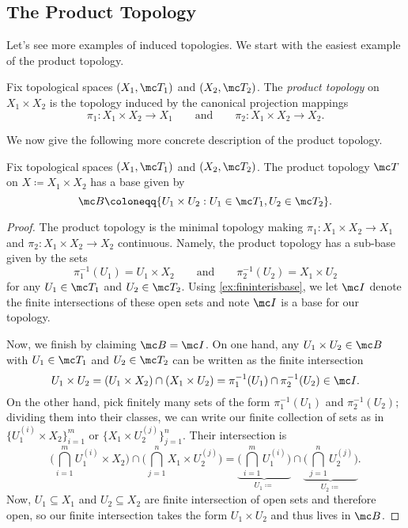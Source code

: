 \documentclass[../notes.tex]{subfiles}
\begin{document}
\subsection{The Product Topology}
Let's see more examples of induced topologies. We start with the easiest example of the product topology.
\begin{defihelper}
	Fix topological spaces $(X_1,\mc T_1)$ and $(X_2,\mc T_2)$. The \textit{product topology} on $X_1\times X_2$ is the topology induced by the canonical projection mappings
	\[\pi_1\colon X_1\times X_2\to X_1\qquad\text{and}\qquad\pi_2\colon X_1\times X_2\to X_2.\]
\end{defihelper}
We now give the following more concrete description of the product topology.
\begin{lemma} \label{lem:twoprodtop}
	Fix topological spaces $(X_1,\mc T_1)$ and $(X_2,\mc T_2)$. The product topology $\mc T$ on $X\coloneqq X_1\times X_2$ has a base given by
	\[\mc B\coloneqq\{U_1\times U_2:U_1\in\mc T_1,U_2\in\mc T_2\}.\]
\end{lemma}
\begin{proof}
	The product topology is the minimal topology making $\pi_1\colon X_1\times X_2\to X_1$ and $\pi_2\colon X_1\times X_2\to X_2$ continuous. Namely, the product topology has a sub-base given by the sets
	\[\pi_1^{-1}(U_1)=U_1\times X_2\qquad\text{and}\qquad\pi_2^{-1}(U_2)=X_1\times U_2\]
	for any $U_1\in\mc T_1$ and $U_2\in\mc T_2$. Using \autoref{ex:fininterisbase}, we let $\mc I$ denote the finite intersections of these open sets and note $\mc I$ is a base for our topology.
	
	Now, we finish by claiming $\mc B=\mc I$. On one hand, any $U_1\times U_2\in\mc B$ with $U_1\in\mc T_1$ and $U_2\in\mc T_2$ can be written as the finite intersection
	\[U_1\times U_2=(U_1\times X_2)\cap(X_1\times U_2)=\pi_1^{-1}(U_1)\cap\pi_2^{-1}(U_2)\in\mc I.\]
	On the other hand, pick finitely many sets of the form $\pi_1^{-1}(U_1)$ and $\pi_2^{-1}(U_2)$; dividing them into their classes, we can write our finite collection of sets as in $\{U_1^{(i)}\times X_2\}_{i=1}^m$ or $\{X_1\times U_2^{(j)}\}_{j=1}^n$. Their intersection is
	\[\Bigg(\bigcap_{i=1}^mU_1^{(i)}\times X_2\Bigg)\cap\Bigg(\bigcap_{j=1}^nX_1\times U_2^{(j)}\Bigg)=\underbrace{\Bigg(\bigcap_{i=1}^mU_1^{(i)}\Bigg)}_{U_1\coloneqq}\cap\underbrace{\Bigg(\bigcap_{j=1}^nU_2^{(j)}\Bigg)}_{U_2\coloneqq}.\]
	Now, $U_1\subseteq X_1$ and $U_2\subseteq X_2$ are finite intersection of open sets and therefore open, so our finite intersection takes the form $U_1\times U_2$ and thus lives in $\mc B$.
\end{proof}
\end{document}

